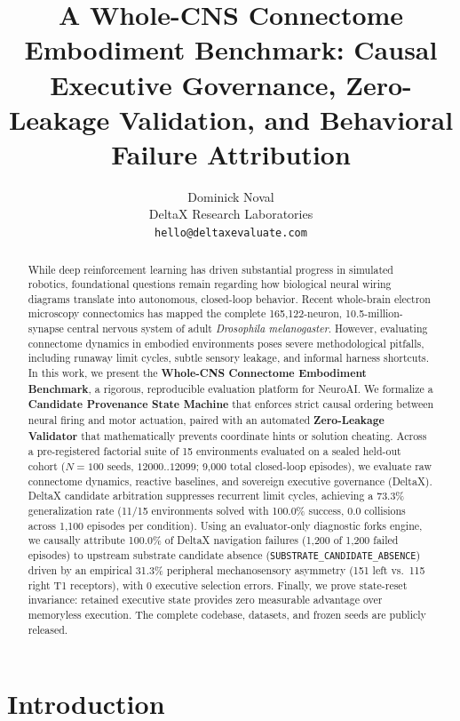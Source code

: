 \documentclass{article}
\title{A Whole-CNS Connectome Embodiment Benchmark: Causal Executive Governance, Zero-Leakage Validation, and Behavioral Failure Attribution}
\author{%
  Dominick Noval \\
  DeltaX Research Laboratories \\
  \texttt{hello@deltaxevaluate.com} \\
}
\begin{document}
\maketitle

\begin{abstract}
While deep reinforcement learning has driven substantial progress in simulated robotics, foundational questions remain regarding how biological neural wiring diagrams translate into autonomous, closed-loop behavior. Recent whole-brain electron microscopy connectomics has mapped the complete 165,122-neuron, 10.5-million-synapse central nervous system of adult \textit{Drosophila melanogaster}. However, evaluating connectome dynamics in embodied environments poses severe methodological pitfalls, including runaway limit cycles, subtle sensory leakage, and informal harness shortcuts. In this work, we present the \textbf{Whole-CNS Connectome Embodiment Benchmark}, a rigorous, reproducible evaluation platform for NeuroAI. We formalize a \textbf{Candidate Provenance State Machine} that enforces strict causal ordering between neural firing and motor actuation, paired with an automated \textbf{Zero-Leakage Validator} that mathematically prevents coordinate hints or solution cheating. Across a pre-registered factorial suite of 15 environments evaluated on a sealed held-out cohort ($N = 100$ seeds, $12000..12099$; 9,000 total closed-loop episodes), we evaluate raw connectome dynamics, reactive baselines, and sovereign executive governance (DeltaX). DeltaX candidate arbitration suppresses recurrent limit cycles, achieving a 73.3\% generalization rate (11/15 environments solved with 100.0\% success, 0.0 collisions across 1,100 episodes per condition). Using an evaluator-only diagnostic forks engine, we causally attribute 100.0\% of DeltaX navigation failures (1,200 of 1,200 failed episodes) to upstream substrate candidate absence (\texttt{SUBSTRATE\_CANDIDATE\_ABSENCE}) driven by an empirical 31.3\% peripheral mechanosensory asymmetry (151 left vs.\ 115 right T1 receptors), with 0 executive selection errors. Finally, we prove state-reset invariance: retained executive state provides zero measurable advantage over memoryless execution. The complete codebase, datasets, and frozen seeds are publicly released.
\end{abstract}

\section{Introduction}
\end{document}

